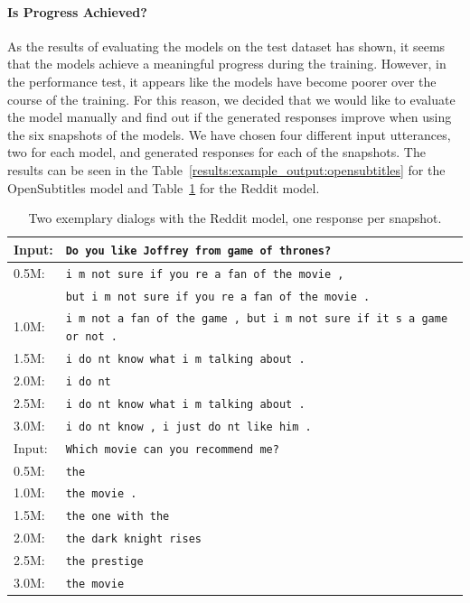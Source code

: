 
\paragraph{Is Progress Achieved?} As the results of evaluating the models on the test dataset has shown, it seems that the models achieve a meaningful progress during the training. However, in the performance test, it appears like the models have become poorer over the course of the training. For this reason, we decided that we would like to evaluate the model manually and find out if the generated responses improve when using the six snapshots of the models. We have chosen four different input utterances, two for each model, and generated responses for each of the snapshots. The results can be seen in the Table~\ref{results:example_output:opensubtitles} for the OpenSubtitles model and Table~\ref{results:example_output:reddit} for the Reddit model.

\begin{table}[H]
	\centering
	\begin{adjustbox}{max width=\textwidth}
		\begin{tabularx}{\textwidth}{lX}
			\toprule
			Input: 	& \texttt{Do you like Joffrey from game of thrones?}\\
			\midrule
			0.5M: 	& \texttt{i m not sure if you re a fan of the movie ,}\\
			& \texttt{but i m not sure if you re a fan of the movie .}\\
			1.0M: 	& \texttt{i m not a fan of the game , but i m not sure if it s a game or not .}\\
			1.5M:	& \texttt{i do nt know what i m talking about .}\\
			2.0M:	& \texttt{i do nt }\\
			2.5M:	& \texttt{i do nt know what i m talking about .}\\
			3.0M:	& \texttt{i do nt know , i just do nt like him .}\\
			\midrule
			Input: 	& \texttt{Which movie can you recommend me?}\\
			\midrule
			0.5M: 	& \texttt{the}\\
			1.0M: 	& \texttt{the movie .}\\
			1.5M:	& \texttt{the one with the}\\
			2.0M:	& \texttt{the dark knight rises}\\
			2.5M:	& \texttt{the prestige}\\
			3.0M:	& \texttt{the movie}\\
			\bottomrule
		\end{tabularx}
	\end{adjustbox}
	\caption{Two exemplary dialogs with the Reddit model, one response per snapshot.}
	\label{results:example_output:reddit}
\end{table}

